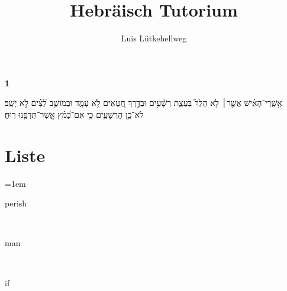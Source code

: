 \documentclass[german]{scrartcl}
\title{Hebräisch Tutorium}
\author{Luis Lütkehellweg}
\newcommand{\rdrchap}[1]{\begin{german}\setRL\small\textbf{#1}\end{german}}
\newcommand{\rdrverse}[1]{\raisebox{2.5pt}{\smaller[4]#1}}
\renewcommand{\*}{\genderchar}
\begin{document}
 \large
	\begin{hebrew}
	\rdrchap{1}\rdrverse{1}
	אַ֥שְֽׁרֵי־הָאִ֗ישׁ אֲשֶׁ֤ר׀ לֹ֥א הָלַךְ֮ בַּעֲצַ֪ת רְשָׁ֫עִ֥ים וּבְדֶ֣רֶךְ חַ֭טָּאִים לֹ֥א עָמָ֑ד וּבְמֹושַׁ֥ב לֵ֝צִ֗ים לֹ֣א יָשָֽׁב׃  	
	\rdrverse{4} לֹא־כֵ֥ן הָרְשָׁעִ֑ים כִּ֥י אִם־כַּ֝מֹּ֗ץ אֲֽשֶׁר־תִּדְּפֶ֥נּוּ רֽוּחַ׃ 
	\end{hebrew}


\section{Liste}

\begin{multicols}{3}
\parindent=0pt
\hangindent=1em
\flushleft
{\hebrewfont{}} \begin{german}perish\end{german}\\
{\hebrewfont{}} \begin{german}man\end{german}\\
{\hebrewfont{}} \begin{german}if\end{german}\\
	
\end{multicols}
\end{document}
